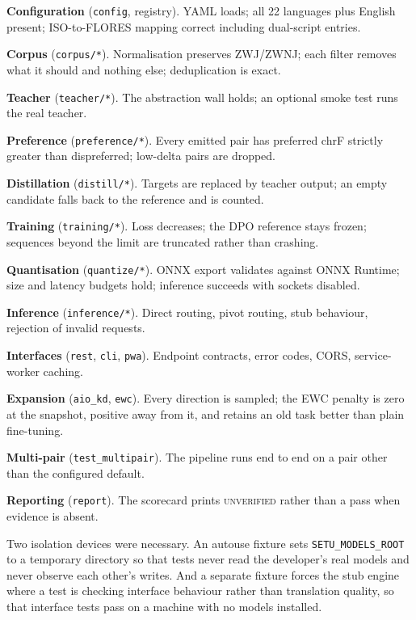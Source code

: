 \begin{bullets}
\item \textbf{Configuration} (\texttt{config}, registry). YAML loads; all 22 languages plus English present; ISO-to-FLORES mapping correct including dual-script entries.
\item \textbf{Corpus} (\texttt{corpus/*}). Normalisation preserves ZWJ/ZWNJ; each filter removes what it should and nothing else; deduplication is exact.
\item \textbf{Teacher} (\texttt{teacher/*}). The abstraction wall holds; an optional smoke test runs the real teacher.
\item \textbf{Preference} (\texttt{preference/*}). Every emitted pair has preferred chrF strictly greater than dispreferred; low-delta pairs are dropped.
\item \textbf{Distillation} (\texttt{distill/*}). Targets are replaced by teacher output; an empty candidate falls back to the reference and is counted.
\item \textbf{Training} (\texttt{training/*}). Loss decreases; the DPO reference stays frozen; sequences beyond the limit are truncated rather than crashing.
\item \textbf{Quantisation} (\texttt{quantize/*}). ONNX export validates against ONNX Runtime; size and latency budgets hold; inference succeeds with sockets disabled.
\item \textbf{Inference} (\texttt{inference/*}). Direct routing, pivot routing, stub behaviour, rejection of invalid requests.
\item \textbf{Interfaces} (\texttt{rest}, \texttt{cli}, \texttt{pwa}). Endpoint contracts, error codes, CORS, service-worker caching.
\item \textbf{Expansion} (\texttt{aio\_kd}, \texttt{ewc}). Every direction is sampled; the EWC penalty is zero at the snapshot, positive away from it, and retains an old task better than plain fine-tuning.
\item \textbf{Multi-pair} (\texttt{test\_multipair}). The pipeline runs end to end on a pair other than the configured default.
\item \textbf{Reporting} (\texttt{report}). The scorecard prints \textsc{unverified} rather than a pass when evidence is absent.
\end{bullets}

Two isolation devices were necessary. An autouse fixture sets
\texttt{SETU\_MODELS\_ROOT} to a temporary directory so that tests never read
the developer's real models and never observe each other's writes. And a
separate fixture forces the stub engine where a test is checking interface
behaviour rather than translation quality, so that interface tests pass on a
machine with no models installed.

